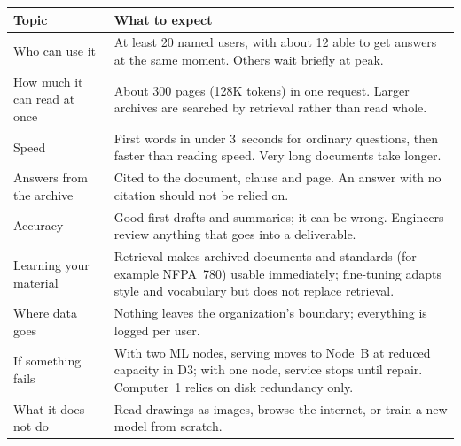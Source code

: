 
{\footnotesize
\begin{xltabular}{\textwidth}{@{}Y{0.7} Y{1.3}@{}}
  \toprule
  Topic & What to expect \\
  \midrule
  \endhead
  Who can use it & At least 20 named users, with about 12 able to get answers at the same moment. Others wait briefly at peak. \\
  How much it can read at once & About 300 pages (128K tokens) in one request. Larger archives are searched by retrieval rather than read whole. \\
  Speed & First words in under 3~seconds for ordinary questions, then faster than reading speed. Very long documents take longer. \\
  Answers from the archive & Cited to the document, clause and page. An answer with no citation should not be relied on. \\
  Accuracy & Good first drafts and summaries; it can be wrong. Engineers review anything that goes into a deliverable. \\
  Learning your material & Retrieval makes archived documents and standards (for example NFPA~780) usable immediately; fine-tuning adapts style and vocabulary but does not replace retrieval. \\
  Where data goes & Nothing leaves the organization's boundary; everything is logged per user. \\
  If something fails & With two ML nodes, serving moves to Node~B at reduced capacity in D3; with one node, service stops until repair. Computer~1 relies on disk redundancy only. \\
  What it does not do & Read drawings as images, browse the internet, or train a new model from scratch. \\
  \bottomrule
\end{xltabular}}
